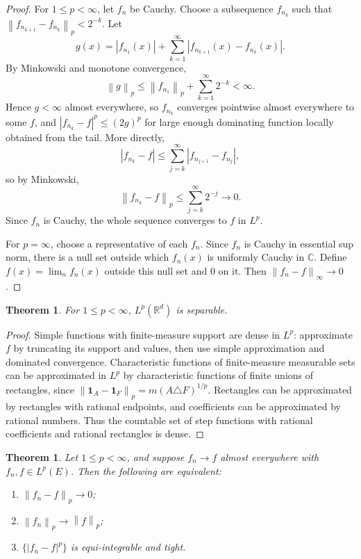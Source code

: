 \documentclass[11pt,openany]{book}
\numberwithin{equation}{chapter}
\theoremstyle{definition}
\theoremstyle{plain}
\newtheorem{theorem}[definition]{Theorem}
\theoremstyle{remark}
\newcommand{\R}{\mathbb{R}}
\newcommand{\C}{\mathbb{C}}
\newcommand{\1}{\mathbf{1}}
\newcommand{\abs}[1]{\left\lvert #1\right\rvert}
\newcommand{\norm}[1]{\left\lVert #1\right\rVert}
\begin{document}
\begin{proof}
For \(1\le p<\infty\), let \(f_n\) be Cauchy.  Choose a subsequence \(f_{n_k}\) such that \(\norm{f_{n_{k+1}}-f_{n_k}}_p<2^{-k}\).  Let
\[
    g(x)=\abs{f_{n_1}(x)}+
    \sum_{k=1}^\infty\abs{f_{n_{k+1}}(x)-f_{n_k}(x)}.
\]
By Minkowski and monotone convergence,
\[
    \norm g_p\le \norm{f_{n_1}}_p+
    \sum_{k=1}^\infty 2^{-k}<\infty.
\]
Hence \(g<\infty\) almost everywhere, so \(f_{n_k}\) converges pointwise almost everywhere to some \(f\), and \(\abs{f_{n_k}-f}^p\le (2g)^p\) for large enough dominating function locally obtained from the tail.  More directly,
\[
    \abs{f_{n_k}-f}\le\sum_{j=k}^\infty\abs{f_{n_{j+1}}-f_{n_j}},
\]
so by Minkowski,
\[
    \norm{f_{n_k}-f}_p\le\sum_{j=k}^\infty2^{-j}\to0.
\]
Since \(f_n\) is Cauchy, the whole sequence converges to \(f\) in \(L^p\).

For \(p=\infty\), choose a representative of each \(f_n\).  Since \(f_n\) is Cauchy in essential sup norm, there is a null set outside which \(f_n(x)\) is uniformly Cauchy in \(\C\).  Define \(f(x)=\lim_nf_n(x)\) outside this null set and \(0\) on it.  Then \(\norm{f_n-f}_\infty\to0\).
\end{proof}

\begin{theorem}
For \(1\le p<\infty\), \(L^p(\R^d)\) is separable.
\end{theorem}

\begin{proof}
Simple functions with finite-measure support are dense in \(L^p\): approximate \(f\) by truncating its support and values, then use simple approximation and dominated convergence.  Characteristic functions of finite-measure measurable sets can be approximated in \(L^p\) by characteristic functions of finite unions of rectangles, since \(\norm{\1_A-\1_F}_p=m(A\triangle F)^{1/p}\).  Rectangles can be approximated by rectangles with rational endpoints, and coefficients can be approximated by rational numbers.  Thus the countable set of step functions with rational coefficients and rational rectangles is dense.
\end{proof}

\begin{theorem}
Let \(1\le p<\infty\), and suppose \(f_n\to f\) almost everywhere with \(f_n,f\in L^p(E)\).  Then the following are equivalent:
\begin{enumerate}[label=(\roman*)]
    \item \(\norm{f_n-f}_p\to0\);
    \item \(\norm{f_n}_p\to\norm f_p\);
    \item \(\{\abs{f_n-f}^p\}\) is equi-integrable and tight.
\end{enumerate}
\end{theorem}
\end{document}
